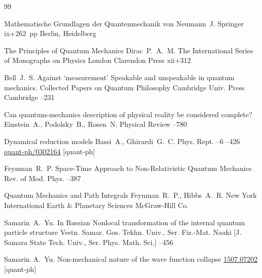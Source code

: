 \begin{thebibliography}{99}

\book Mathematische Grundlagen der Quantenmechanik
\by von Neumann~J.
\publ Springer
\totalpages ix+262~pp \nofrills
\publaddr Berlin, Heidelberg

\book The Principles of Quantum Mechanics
\by Dirac~P.~A.~M.
\serial  The International Series of Monographs on Physics 
\publaddr London
\publ Clarendon Press
\totalpages  xii+312 

\by Bell~J.~S.
\paper Against `measurement' 
\inbook Speakable and unspeakable in quantum mechanics. \rm  Collected Papers on Quantum Philosophy
\publ  Cambridge Univ. Press 
\publaddr Cambridge 
--231

\paper Can quantum-mechanics description of physical reality be considered complete?
\by Einstein~A., Podolsky~B., Rosen~N.
\jour Physical Review
--780

\paper Dynamical reduction models
\by Bassi~A., Ghirardi~G.~C.
\jour Phys. Rept.
--6
--426
\arxiv \href{https://arxiv.org/abs/quant-ph/0302164}{quant-ph/0302164} [quant-ph]

\by Feynman~R.~P.
\paper Space-Time Approach to Non-Relativistic Quantum Mechanics
\jour Rev. of Mod. Phys.
--387

\book Quantum Mechanics and Path Integrals
\by Feynman~R.~P., Hibbs~A.~R.
\publaddr New York
\serial  International Earth \& Planetary Sciences
\publ McGraw-Hill Co.



\by Samarin~A.~Yu.
\lang In Russian
\paper Nonlocal transformation of the internal quantum particle structure
\jour Vestn. Samar. Gos. Tekhn. Univ., Ser. Fiz.-Mat. Nauki \rm [J. Samara State Tech. Univ., Ser. Phys. Math. Sci.]
--456


\by Samarin~A.~Yu.
\preprint 	Non-mechanical nature of the wave function collapse 
\arxiv \href{https://arxiv.org/abs/1507.07202}{1507.07202} [quant-ph]


\end{thebibliography}
